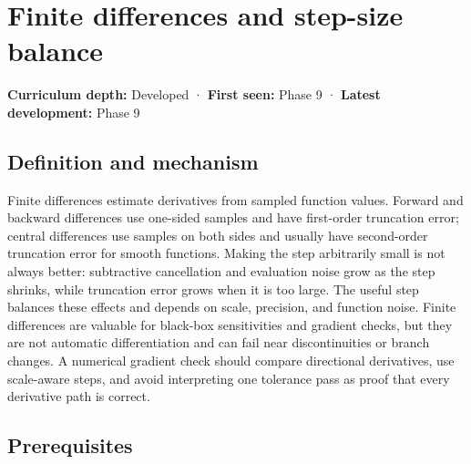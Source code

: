 \hypertarget{appendix-e2d7b4f2161d}{}\label{referencestart:appendix-e2d7b4f2161d}
\section{Finite differences and step-size balance}\label{appendix-e2d7b4f2161d-finite-differences-and-step-size-balance}

\hypertarget{appendix-e2d7b4f2161d-finite-differences-and-step-size-balance}{}

\textbf{Curriculum depth:} Developed · \textbf{First seen:} Phase 9 · \textbf{Latest development:} Phase 9

\begin{allmightroledefinition}

\subsection{Definition and mechanism}\label{appendix-e2d7b4f2161d-definition-and-mechanism}

\hypertarget{appendix-e2d7b4f2161d-definition-and-mechanism}{}

Finite differences estimate derivatives from sampled function values. Forward and backward differences use one-sided samples and have first-order truncation error; central differences use samples on both sides and usually have second-order truncation error for smooth functions. Making the step arbitrarily small is not always better: subtractive cancellation and evaluation noise grow as the step shrinks, while truncation error grows when it is too large. The useful step balances these effects and depends on scale, precision, and function noise. Finite differences are valuable for black-box sensitivities and gradient checks, but they are not automatic differentiation and can fail near discontinuities or branch changes. A numerical gradient check should compare directional derivatives, use scale-aware steps, and avoid interpreting one tolerance pass as proof that every derivative path is correct.

\end{allmightroledefinition}

\subsection{Prerequisites}\label{appendix-e2d7b4f2161d-prerequisites}

\hypertarget{appendix-e2d7b4f2161d-prerequisites}{}

